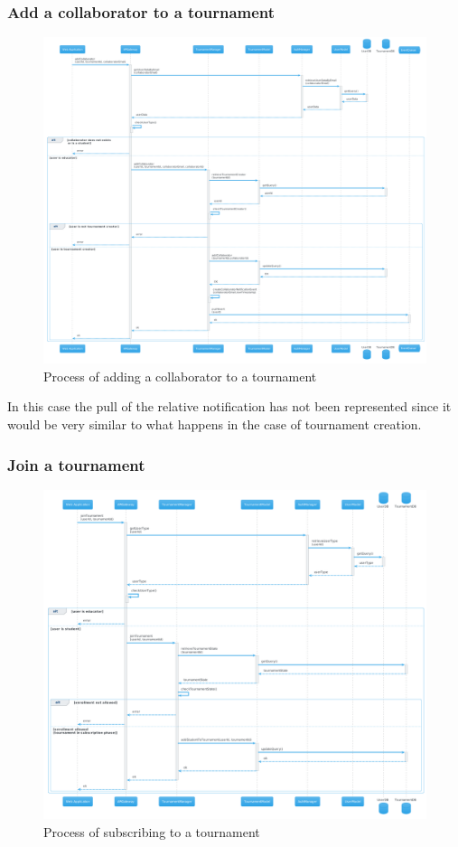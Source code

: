 \subsubsection{Add a collaborator to a tournament}
\begin{figure}[H]
    \hspace{-1.5cm}
    \includegraphics[width=1.2\textwidth]{Diagrams/sequence/add_collaborator.png}
    \caption{Process of adding a collaborator to a tournament}
\end{figure}
In this case the pull of the relative notification has not been represented since it would be very similar to what happens in the case of tournament creation.

\newpage
\subsubsection{Join a tournament}
\begin{figure}[H]
    \hspace{-1.5cm}
    \includegraphics[width=1.2\textwidth]{Diagrams/sequence/join_tournament.png}
    \caption{Process of subscribing to a tournament}
\end{figure}

